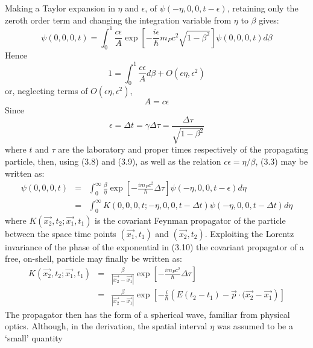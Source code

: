 \documentclass [12pt]{article}
\begin{document}
{  Making a Taylor expansion in $\eta$ and $\epsilon$, of  $\psi(-\eta, 0,0,t-\epsilon)$,
  retaining only the zeroth order term and changing the integration variable from $\eta$ to 
  $\beta$ gives:
  \begin{equation}
   \psi(0,0,0,t) =  \int_0^1 \frac{c\epsilon}{A} \exp\left[
  -\frac{i \epsilon}{\hbar}m_P c^2\sqrt{1-\beta^2}\right] \psi(0,0,0,t) d\beta
 \end{equation}
  Hence 
  \begin{equation}
 1 =   \int_0^1 \frac{c\epsilon}{A}d\beta +O(\epsilon \eta,\epsilon^2)
 \end{equation}
   or, neglecting terms of $O(\epsilon \eta,\epsilon^2)$,
  \begin{equation}
   A= c \epsilon
 \end{equation}
  Since 
 \begin{equation}
 \epsilon = \Delta t = \gamma  \Delta \tau = \frac{\Delta \tau}{\sqrt{1-\beta^2}}
 \end{equation}
 where $t$ and $\tau$ are the laboratory and proper times respectively of the propagating
  particle, then, using  (3.8) and (3.9), as well as the relation $c \epsilon = \eta/\beta$, (3.3)
  may be written as:
 \begin{eqnarray}
   \psi(0,0,0,t) & = & \int_0^{\infty} \frac{\beta}{\eta} \exp\left[
  -\frac{i m_P c^2}{\hbar} \Delta  \tau\right] \psi(-\eta,0,0,t-\epsilon) d\eta
  \nonumber \\
    & = & \int_0^{\infty} K(0,0,0,t;-\eta,0,0,t-\Delta t) \psi(-\eta,0,0,t-\Delta t)d\eta 
 \end{eqnarray}
  where $K(\vec{x_2},t_2; \vec{x_1},t_1)$ is the covariant Feynman propagator
 of the particle between the space time points $(\vec{x_1},t_1)$ and $(\vec{x_2},t_2)$.
  Exploiting the Lorentz invariance of the phase of the exponential in (3.10) the
  covariant propagator of a free, on-shell, particle may finally be written as:
   \begin{eqnarray}
    K(\vec{x_2},t_2; \vec{x_1},t_1) & = &  \frac{\beta}{|\vec{x_2}-\vec{x_1}|}
 \exp\left[-\frac{i m_P c^2}{\hbar} \Delta  \tau\right] \nonumber \\
   & = & \frac{\beta}{|\vec{x_2}-\vec{x_1}|}
 \exp\left[-\frac{i}{\hbar}\left(E(t_2-t_1)-\vec{p}\cdot(\vec{x_2}-\vec{x_1}\right)\right]
 \end{eqnarray}
  The propagator then has the form of a spherical wave, familiar from physical optics.
 Although, in the derivation, the spatial interval $\eta$ was assumed to be a `small' quantity
}
\end{document}
